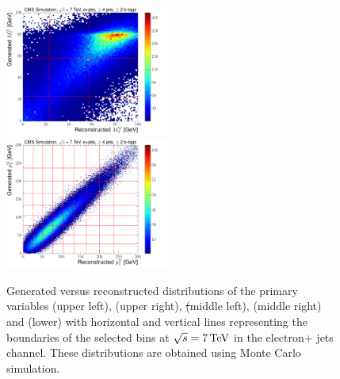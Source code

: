 \begin{figure}[hbtp]
     \includegraphics[width=0.48\textwidth]{Chapters/04_Analysis/04b_XSections/images/binning/electron_MT_7TeV.pdf}\\
	 \includegraphics[width=0.48\textwidth]{Chapters/04_Analysis/04b_XSections/images/binning/electron_WPT_7TeV.pdf}\hfill
	 \caption{Generated versus reconstructed distributions of the primary variables \met (upper left), \HT (upper
	 right), \st (middle left), \mt (middle right) and \wpt (lower) with horizontal and vertical lines
	 representing the boundaries of the selected bins at $\sqrt{s}=7\,\text{Te\hspace{-.08em}V}$ in the electron+ jets channel. These
	 distributions are obtained using \ttbar Monte Carlo simulation.}
     \label{fig:binning_7TeV_electron}
\end{figure}

